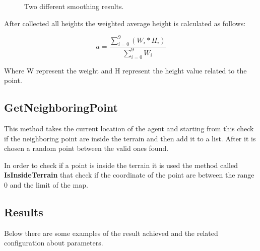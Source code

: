 \documentclass[12pt]{article}
\begin{document}
    \begin{figure}
        \centering     %
        \caption{Two different smoothing results.}
        \label{fig:SmotthingCamparison}
    \end{figure}
        
    
    After collected all heights the weighted average height is calculated as follows:

    \begin{equation}
        a = \dfrac{\sum\limits_{i=0}^{9} (W_i * H_i) }{ \sum\limits_{i=0}^{9} W_i }
    \end{equation}

    \noindent
    Where W represent the weight and H represent the height value related to the point. 

    \subsection{GetNeighboringPoint}
    This method takes the current location of the agent and starting from this check if the neighboring point are inside the terrain and then add it to a list. After it is chosen a 
    random point between the valid ones found.

    In order to check if a point is inside the terrain it is used the method called \textbf{IsInsideTerrain} that check if the coordinate of the point are between the range 0 and
    the limit of the map.

    \subsection{Results}
    Below there are some examples of the result achieved and the related configuration about parameters.
\end{document}
